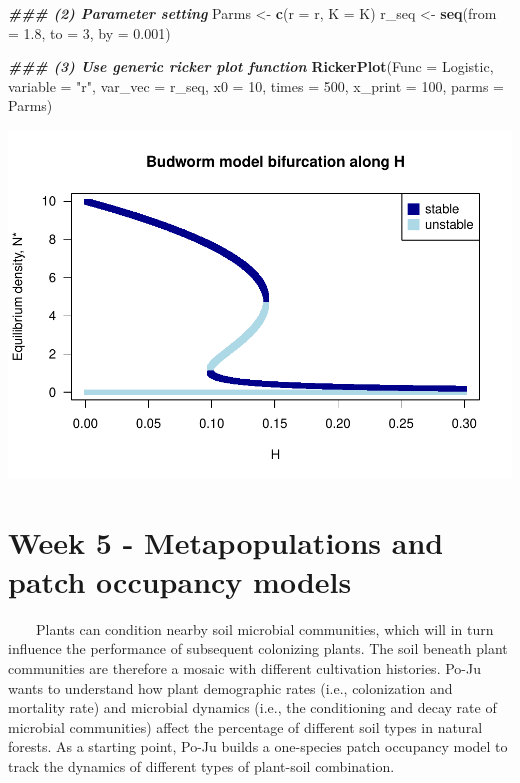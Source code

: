 \documentclass[
]{book}
\newenvironment{Shaded}{\begin{snugshade}}{\end{snugshade}}
\newcommand{\AttributeTok}[1]{\textcolor[rgb]{0.13,0.29,0.53}{#1}}
\newcommand{\DecValTok}[1]{\textcolor[rgb]{0.00,0.00,0.81}{#1}}
\newcommand{\DocumentationTok}[1]{\textcolor[rgb]{0.56,0.35,0.01}{\textbf{\textit{#1}}}}
\newcommand{\FloatTok}[1]{\textcolor[rgb]{0.00,0.00,0.81}{#1}}
\newcommand{\FunctionTok}[1]{\textcolor[rgb]{0.13,0.29,0.53}{\textbf{#1}}}
\newcommand{\NormalTok}[1]{#1}
\newcommand{\OtherTok}[1]{\textcolor[rgb]{0.56,0.35,0.01}{#1}}
\newcommand{\StringTok}[1]{\textcolor[rgb]{0.31,0.60,0.02}{#1}}
\begin{document}
\begin{Shaded}
\begin{Highlighting}[]
\DocumentationTok{\#\#\# (2) Parameter setting}
\NormalTok{Parms }\OtherTok{\textless{}{-}} \FunctionTok{c}\NormalTok{(}\AttributeTok{r =}\NormalTok{ r, }\AttributeTok{K =}\NormalTok{ K)}
\NormalTok{r\_seq }\OtherTok{\textless{}{-}} \FunctionTok{seq}\NormalTok{(}\AttributeTok{from =} \FloatTok{1.8}\NormalTok{, }\AttributeTok{to =} \DecValTok{3}\NormalTok{, }\AttributeTok{by =} \FloatTok{0.001}\NormalTok{)}

\DocumentationTok{\#\#\# (3) Use generic ricker plot function}
\FunctionTok{RickerPlot}\NormalTok{(}\AttributeTok{Func =}\NormalTok{ Logistic, }
           \AttributeTok{variable =} \StringTok{"r"}\NormalTok{, }
           \AttributeTok{var\_vec =}\NormalTok{ r\_seq, }
           \AttributeTok{x0 =} \DecValTok{10}\NormalTok{, }
           \AttributeTok{times =} \DecValTok{500}\NormalTok{, }
           \AttributeTok{x\_print =} \DecValTok{100}\NormalTok{, }
           \AttributeTok{parms =}\NormalTok{ Parms)}
\end{Highlighting}
\end{Shaded}

\includegraphics{bookdown-demo_files/figure-latex/unnamed-chunk-20-1.pdf}

\hypertarget{week-5---metapopulations-and-patch-occupancy-models}{%
\chapter*{Week 5 - Metapopulations and patch occupancy models}\label{week-5---metapopulations-and-patch-occupancy-models}}

~~~~Plants can condition nearby soil microbial communities, which will in turn influence the performance of subsequent colonizing plants. The soil beneath plant communities are therefore a mosaic with different cultivation histories. Po-Ju wants to understand how plant demographic rates (i.e., colonization and mortality rate) and microbial dynamics (i.e., the conditioning and decay rate of microbial communities) affect the percentage of different soil types in natural forests. As a starting point, Po-Ju builds a one-species patch occupancy model to track the dynamics of different types of plant-soil combination.
\end{document}

